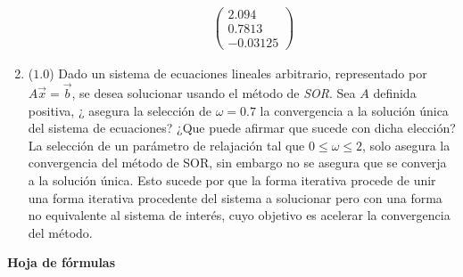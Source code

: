 \documentclass[12pt]{article}
\begin{document}
\begin{enumerate}[leftmargin=*,widest=9]
\begin{enumerate}[label=\alph*]
\begin{eqnarray*}
\begin{pmatrix}
    2.094 \\ 0.7813\\ -0.03125
    \end{pmatrix}
   \end{eqnarray*}
    \end{enumerate}
  \item (\(1.0\)) Dado un sistema de ecuaciones lineales arbitrario, representado por \(A\vec{x} = \vec{b}\), se desea solucionar usando el método de \textit{SOR}. Sea \(A\) definida positiva, ¿ asegura la selección de \(\omega = 0.7\) la convergencia a la solución única del sistema de ecuaciones? ¿Que puede afirmar que sucede con dicha elección?
  La selección de un parámetro de relajación tal que \(0 \leq \omega \leq 2\), solo asegura la convergencia del método de SOR, sin embargo no se asegura que se converja a la solución única. Esto sucede por que la forma iterativa procede de unir una forma iterativa procedente del sistema a solucionar pero con una forma no equivalente al sistema de interés, cuyo objetivo es acelerar la convergencia del método.
  \end{enumerate}
\clearpage
\begin{center}
\textbf{Hoja de fórmulas}
\end{center}
\end{document}
